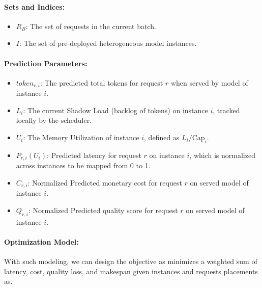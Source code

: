 \documentclass[letterpaper, anonymous, twocolumn, 10pt]{article}
\begin{document}
\paragraph{Sets and Indices:}
\begin{itemize}
    \item $R_B$: The set of requests in the current batch.
    \item $I$: The set of pre-deployed heterogeneous model instances.
\end{itemize}

\paragraph{Prediction Parameters:}
\begin{itemize}
    \item $token_{r,i}$: The predicted total tokens for request $r$ when served by model of instance $i$.
    \item $L_{i}$: The current Shadow Load (backlog of tokens) on instance $i$, tracked locally by the scheduler.
    \item $U_{i}$: The Memory Utilization of instance $i$, defined as $L_i / \text{Cap}_i$.
    \item $P_{r,i}(U_i)$: Predicted latency for request $r$ on instance $i$, which is normalized across instances to be mapped from 0 to 1. 
    \item $C_{r,i}$: Normalized Predicted monetary cost for request $r$ on served model of instance $i$.
    \item $Q_{r,i}$: Normalized Predicted quality score for request $r$ on served model of instance $i$.
\end{itemize}

\paragraph{Optimization Model:}
With such modeling, we can design the objective as minimizes a weighted sum of latency, cost, quality loss, and makespan given instances and requests placements as.
\end{document}
